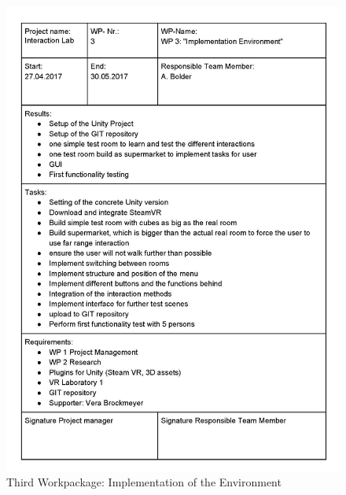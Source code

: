\newpage
\begin{figure}[H] 
	\center 
	\includegraphics[width= 16 cm]{Images/Workpackages_Seite_3.jpg}			
	\caption[]{Third Workpackage: Implementation of the  Environment}
	\label{fig:Workpackage3}
\end{figure} 

